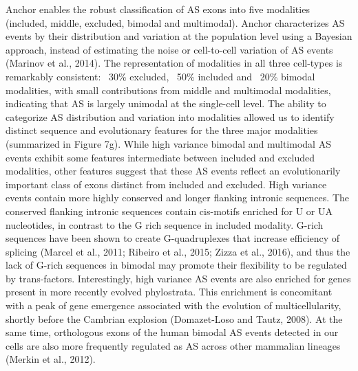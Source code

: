 Anchor enables the robust classification of AS exons into five modalities (included, middle, excluded, bimodal and multimodal). Anchor characterizes AS events by their distribution and variation at the population level using a Bayesian approach, instead of estimating the noise or cell-to-cell variation of AS events (Marinov et al., 2014).  The representation of modalities in all three cell-types is remarkably consistent: ~30\% excluded, ~50\% included and ~20\% bimodal modalities, with small contributions from middle and multimodal modalities, indicating that AS is largely unimodal at the single-cell level. The ability to categorize AS distribution and variation into modalities allowed us to identify distinct sequence and evolutionary features for the three major modalities (summarized in Figure 7g). While high variance bimodal and multimodal AS events exhibit some features intermediate between included and excluded modalities, other features suggest that these AS events reflect an evolutionarily important class of exons distinct from included and excluded. High variance events contain more highly conserved and longer flanking intronic sequences. The conserved flanking intronic sequences contain cis-motifs enriched for U or UA nucleotides, in contrast to the G rich sequence in included modality. G-rich sequences have been shown to create G-quadruplexes that increase efficiency of splicing (Marcel et al., 2011; Ribeiro et al., 2015; Zizza et al., 2016), and thus the lack of G-rich sequences in bimodal may promote their flexibility to be regulated by trans-factors. Interestingly, high variance AS events are also enriched for genes present in more recently evolved phylostrata. This enrichment is concomitant with a peak of gene emergence associated with the evolution of multicellularity, shortly before the Cambrian explosion (Domazet-Loso and Tautz, 2008). At the same time, orthologous exons of the human bimodal AS events detected in our cells are also more frequently regulated as AS across other mammalian lineages (Merkin et al., 2012). 

